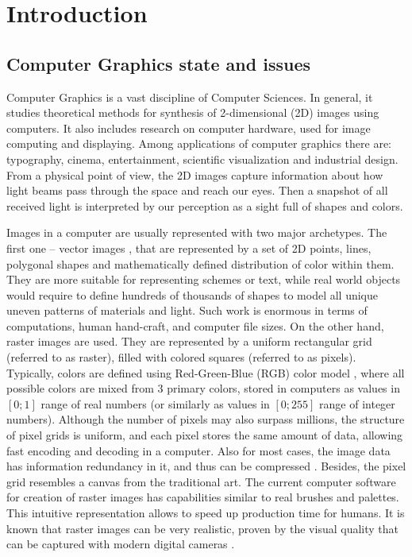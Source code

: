 \chapter{Introduction}\label{chapter:intro}

\section{Computer Graphics state and issues}\label{intro:cg}

Computer Graphics is a vast discipline of Computer Sciences. In general, it studies theoretical methods for synthesis of 2-dimensional (2D) images using computers. It also includes research on computer hardware, used for image computing and displaying. Among applications of computer graphics there are: typography, cinema, entertainment, scientific visualization and industrial design. From a physical point of view, the 2D images capture information about how light beams pass through the space and reach our eyes. Then a snapshot of all received light is interpreted by our perception as a sight full of shapes and colors. 

Images in a computer are usually represented with two major archetypes. The first one -- vector images \cite{aux:vector14}, that are represented by a set of 2D points, lines, polygonal shapes and mathematically defined distribution of color within them. They are more suitable for representing schemes or text, while real world objects would require to define hundreds of thousands of shapes to model all unique uneven patterns of materials and light. Such work is enormous in terms of computations, human hand-craft, and computer file sizes. On the other hand, raster images \cite{aux:raster94} are used. They are represented by a uniform rectangular grid (referred to as raster), filled with colored squares (referred to as pixels). Typically, colors are defined using Red-Green-Blue (RGB) color model \cite{aux:color05}, where all possible colors are mixed from 3 primary colors, stored in computers as values in $[0;1]$ range of real numbers (or similarly as values in $[0;255]$ range of integer numbers). Although the number of pixels may also surpass millions, the structure of pixel grids is uniform, and each pixel stores the same amount of data, allowing fast encoding and decoding in a computer. Also for most cases, the image data has information redundancy in it, and thus can be compressed \cite{aux:compression18}. Besides, the pixel grid resembles a canvas from the traditional art. The current computer software for creation of raster images has capabilities similar to real brushes and palettes. This intuitive representation allows to speed up production time for humans. It is known that raster images can be very realistic, proven by the visual quality that can be captured with modern digital cameras \cite{aux:camera21}.

